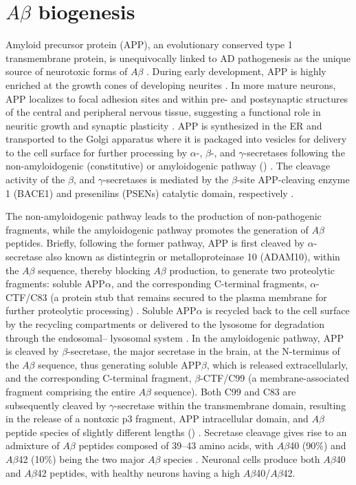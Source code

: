 \section{$A\beta$ biogenesis}
Amyloid precursor protein (APP), an evolutionary conserved type 1 transmembrane protein, is unequivocally linked to AD pathogenesis as the unique source of neurotoxic forms of $A\beta$ \citep{Chen2015,Rajendran2012}. During early development, APP is highly enriched at the growth cones of developing neurites \citep{Ramaker2016,Sabo2003}. In more mature neurons, APP localizes to focal adhesion sites and within pre- and postsynaptic structures of the central and peripheral nervous tissue, suggesting a functional role in neuritic growth and synaptic plasticity \citep{Ashley2005,Yamazaki1997}. APP is synthesized in the ER and transported to the Golgi apparatus where it is packaged into vesicles for delivery to the cell surface for further processing by $\alpha$-, $\beta$-, and $\gamma$-secretases following the non-amyloidogenic (constitutive) or amyloidogenic pathway () \citep{Obrien2011,Ramaker2016}. The cleavage activity of the $\beta$, and $\gamma$-secretases is mediated by the  $\beta$-site APP-cleaving enzyme 1 (BACE1) and presenilins (PSENs) catalytic domain, respectively \citep{Rajendran2012}. 

The non-amyloidogenic pathway leads to the production of non-pathogenic fragments, while the amyloidogenic pathway promotes the generation of $A\beta$ peptides. Briefly, following the former pathway, APP is first cleaved by $\alpha$-secretase also known as distintegrin or metalloproteinase 10 (ADAM10), within the $A\beta$ sequence, thereby blocking $A\beta$ production, to generate two proteolytic fragments: soluble APP$\alpha$, and the corresponding C-terminal fragments, $\alpha$-CTF/C83 (a protein stub that remains secured to the plasma membrane for further proteolytic processing) \citep{Gandy1994,Roychaudhuri2009}. Soluble APP$\alpha$ is recycled back to the cell surface by the recycling compartments or delivered to the lysosome for degradation through the endosomal– lysosomal system \citep{Caster2013,Golde1992}. In the amyloidogenic pathway, APP is cleaved by $\beta$-secretase, the major secretase in the brain, at the N-terminus of the $A\beta$ sequence, thus generating soluble APP$\beta$, which is released extracellularly, and the corresponding C-terminal fragment, $\beta$-CTF/C99 (a membrane-associated fragment comprising the entire $A\beta$ sequence). Both C99 and C83 are subsequently cleaved by $\gamma$-secretase within the transmembrane domain, resulting in the release of a nontoxic p3 fragment, APP intracellular domain, and $A\beta$ peptide species of slightly different lengths () \citep{Cole2007,Jarrett1993}. Secretase cleavage gives rise to an admixture of $A\beta$ peptides composed of 39–43 amino acids, with $A\beta$40 (90\%) and $A\beta$42 (10\%) being the two major $A\beta$ species \citep{Gouras2000,Takahasi2013}. Neuronal cells produce both $A\beta$40 and $A\beta$42 peptides, with healthy neurons having a high $A\beta$40/$A\beta$42.

